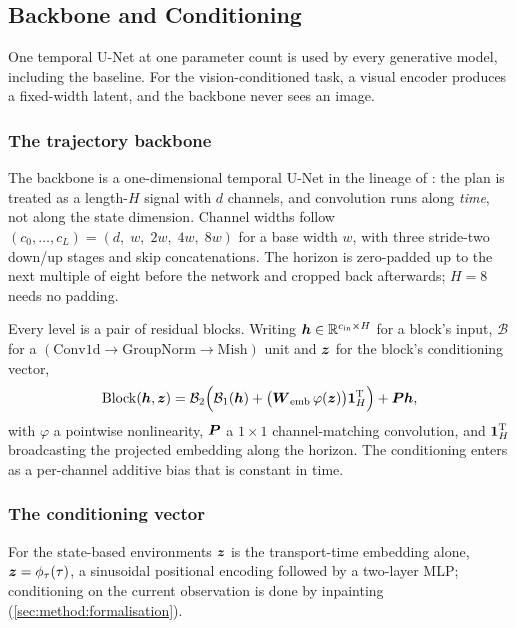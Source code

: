 \subsection{Backbone and Conditioning}\label{sec:method:backbone}

One temporal U-Net at one parameter count is used by every generative model, including the
baseline. For the vision-conditioned task, a visual encoder produces a fixed-width latent, and the
backbone never sees an image.

\subsubsection*{The trajectory backbone}

The backbone is a one-dimensional temporal U-Net in the lineage of
\parencite{janner2022planning}: the plan is treated as a length-$H$ signal with $d$ channels,
and convolution runs along \emph{time}, not along the state dimension. Channel widths follow
$\left(c_{0},\dots,c_{L}\right) = \left(d,\;w,\;2w,\;4w,\;8w\right)$ for a base width $w$, with
three stride-two down/up stages and skip concatenations. The horizon is zero-padded up to the next
multiple of eight before the network and cropped back afterwards; $H = 8$ needs no padding.

Every level is a pair of residual blocks. Writing $\boldsymbol{h}\in\mathbb{R}^{c_{\textrm{in}}\times H}$ for a block's
input, $\mathcal{B}$ for a $\left(\text{Conv1d}\to\text{GroupNorm}\to\text{Mish}\right)$ unit and
$\boldsymbol{z}$ for the block's conditioning vector,
\begin{equation}\label{eq:method:backbone:block}
  \operatorname{Block}(\boldsymbol{h},\boldsymbol{z})
  = \mathcal{B}_{2}\Big(\mathcal{B}_{1}(\boldsymbol{h}) + \big(\boldsymbol{W}_{\textrm{emb}}\,\varphi(\boldsymbol{z})\big)\boldsymbol{1}_{H}^{\textrm{T}}\Big)
    + \boldsymbol{P}\boldsymbol{h},
\end{equation}
with $\varphi$ a pointwise nonlinearity, $\boldsymbol{P}$ a $1\times1$ channel-matching convolution, and
$\boldsymbol{1}_{H}^{\textrm{T}}$ broadcasting the projected embedding along the horizon. The conditioning
enters as a per-channel additive bias that is constant in time.

\subsubsection*{The conditioning vector}

For the state-based environments $\boldsymbol{z}$ is the transport-time embedding alone,
$\boldsymbol{z} = \phi_{\tau}(\tau)$, a sinusoidal positional encoding followed by a two-layer MLP;
conditioning on the current observation is done by inpainting
(\autoref{sec:method:formalisation}).

